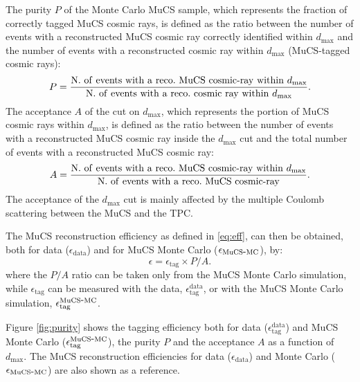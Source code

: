 \documentclass[a4paper,11pt]{article}
\def\myhyphen{{\hbox{-}}}
\begin{document}
The purity $P$ of the Monte Carlo MuCS sample, which represents the fraction of correctly tagged MuCS cosmic rays, is defined as the ratio between the number of events with a reconstructed MuCS cosmic ray correctly identified within $d_{\mathrm{max}}$ and the number of events with a reconstructed cosmic ray within $d_{\mathrm{max}}$ (MuCS-tagged cosmic rays):
\begin{equation}
  P=\frac{\mathrm{N.~of~events~with~a~reco.~MuCS~cosmic\myhyphen ray~within~}d_{\mathrm{max}}}{\mathrm{N.~of~events~with~a~reco.~cosmic~ray~within~}d_{\mathrm{max}}}.
\end{equation}
The acceptance $A$ of the cut on $d_{\mathrm{max}}$, which represents the portion of MuCS cosmic rays within $d_{\mathrm{max}}$, is defined as the ratio between the number of events with a reconstructed MuCS cosmic ray inside the $d_{\mathrm{max}}$ cut and the total number of events with a reconstructed MuCS cosmic ray:
\begin{equation}
  A=\frac{\mathrm{N.~of~events~with~a~reco.~MuCS~cosmic\myhyphen ray~within~}d_{\mathrm{max}}}{\mathrm{N.~of~events~with~a~reco.~MuCS~cosmic\myhyphen ray}}.
\end{equation}
The acceptance of the $d_{\mathrm{max}}$ cut is mainly affected by the multiple Coulomb scattering between the MuCS and the TPC.

The MuCS reconstruction efficiency as defined in \eqref{eq:eff}, can then be obtained, both for data ($\epsilon_{\mathrm{data}}$) and for MuCS Monte Carlo ($\epsilon_{\mathrm{MuCS\myhyphen MC}}$), by:
\begin{equation}\label{eq:mceff}
  \epsilon = \epsilon_{\mathrm{tag}} \times P / A.
\end{equation}
where the $P/A$ ratio can be taken only from the MuCS Monte Carlo simulation, while $\epsilon_{\mathrm{tag}}$ can be measured with the data, $\epsilon^{\mathrm{data}}_{\mathrm{tag}}$, or with the MuCS Monte Carlo simulation, $\epsilon^{\mathrm{MuCS\myhyphen MC}}_{\mathrm{tag}}$.

Figure \ref{fig:purity} shows the tagging efficiency both for data ($\epsilon^{\mathrm{data}}_{\mathrm{tag}}$) and MuCS Monte Carlo  ($\epsilon^{\mathrm{MuCS\myhyphen MC}}_{\mathrm{tag}}$), the purity $P$ and the acceptance $A$ as a function of $d_{\mathrm{max}}$. The MuCS reconstruction efficiencies for data ($\epsilon_{\mathrm{data}}$) and Monte Carlo ($\epsilon_{\mathrm{MuCS\myhyphen MC}}$) are also shown as a reference.
\end{document}
